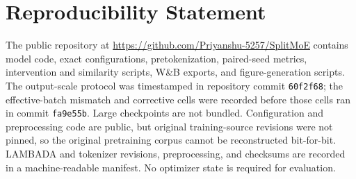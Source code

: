 \documentclass[10pt]{article}
\begin{document}
\section*{Reproducibility Statement}
The public repository at \url{https://github.com/Priyanshu-5257/SplitMoE} contains model code, exact configurations, pretokenization, paired-seed metrics, intervention and similarity scripts, W\&B exports, and figure-generation scripts. The output-scale protocol was timestamped in repository commit \texttt{60f2f68}; the effective-batch mismatch and corrective cells were recorded before those cells ran in commit \texttt{fa9e55b}. Large checkpoints are not bundled. Configuration and preprocessing code are public, but original training-source revisions were not pinned, so the original pretraining corpus cannot be reconstructed bit-for-bit. LAMBADA and tokenizer revisions, preprocessing, and checksums are recorded in a machine-readable manifest. No optimizer state is required for evaluation.



\end{document}
